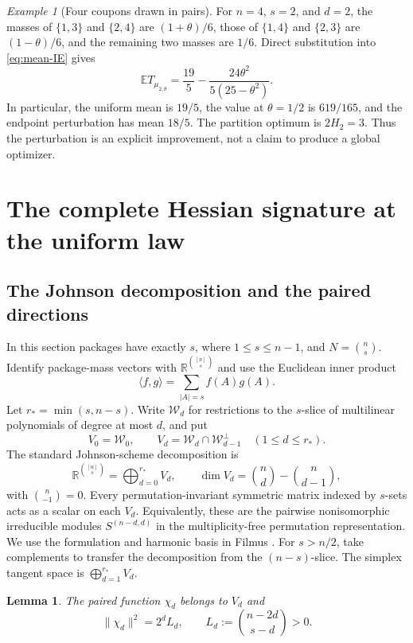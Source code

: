 \documentclass[11pt]{article}
\numberwithin{equation}{section}
\newtheorem{lemma}[theorem]{Lemma}
\theoremstyle{remark}
\newtheorem{example}[theorem]{Example}
\newcommand{\E}{\mathbb E}
\newcommand{\1}{\mathbf 1}
\begin{document}
\begin{example}[Four coupons drawn in pairs]\label{ex:four}
For $n=4$, $s=2$, and $d=2$, the masses of $\{1,3\}$ and $\{2,4\}$ are $(1+\theta)/6$, those of $\{1,4\}$ and $\{2,3\}$ are $(1-\theta)/6$, and the remaining two masses are $1/6$. Direct substitution into \eqref{eq:mean-IE} gives
\[
 \E T_{\mu_{2,\theta}}
 =\frac{19}{5}-\frac{24\theta^2}{5(25-\theta^2)}.
\]
In particular, the uniform mean is $19/5$, the value at $\theta=1/2$ is $619/165$, and the endpoint perturbation has mean $18/5$. The partition optimum is $2H_2=3$. Thus the perturbation is an explicit improvement, not a claim to produce a global optimizer.
\end{example}

\section{The complete Hessian signature at the uniform law}\label{sec:hessian}

\subsection{The Johnson decomposition and the paired directions}

In this section packages have exactly $s$, where $1\leq s\leq n-1$, and $N=\binom ns$. Identify package-mass vectors with $\mathbb R^{\binom{[n]}s}$ and use the Euclidean inner product
\[
 \langle f,g\rangle=\sum_{|A|=s}f(A)g(A).
\]
Let $r_* =\min(s,n-s)$. Write $\mathcal W_d$ for restrictions to the $s$-slice of multilinear polynomials of degree at most $d$, and put
\[
 V_0=\mathcal W_0,\qquad
 V_d=\mathcal W_d\cap\mathcal W_{d-1}^{\perp}\quad(1\leq d\leq r_*).
\]
The standard Johnson-scheme decomposition is
\begin{equation}\label{eq:johnson}
 \mathbb R^{\binom{[n]}s}=\bigoplus_{d=0}^{r_*}V_d,
 \qquad
 \dim V_d=\binom nd-\binom n{d-1},
\end{equation}
with $\binom n{-1}=0$. Every permutation-invariant symmetric matrix indexed by $s$-sets acts as a scalar on each $V_d$. Equivalently, these are the pairwise nonisomorphic irreducible modules $S^{(n-d,d)}$ in the multiplicity-free permutation representation. We use the formulation and harmonic basis in Filmus \cite[Lemma~2, Theorem~15, and Lemma~18]{Filmus}. For $s>n/2$, take complements to transfer the decomposition from the $(n-s)$-slice. The simplex tangent space is $\bigoplus_{d=1}^{r_*}V_d$.

\begin{lemma}\label{lem:chi-eigenspace}
The paired function $\chi_d$ belongs to $V_d$ and
\begin{equation}\label{eq:chi-norm}
 \|\chi_d\|^2=2^d L_d,
 \qquad L_d:=\binom{n-2d}{s-d}>0.
\end{equation}
\end{lemma}
\end{document}
